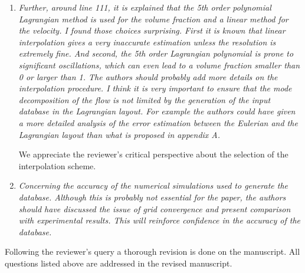 \documentclass[a4paper]{article}
\begin{document}
\begin{enumerate}
\item
\textit{Further, around line 111, it is explained that the 5th order polynomial Lagrangian method is used for the volume fraction and a linear method for the velocity. I found those choices surprising. First it is known that linear interpolation gives a very inaccurate estimation unless the resolution is extremely fine. And second, the 5th order Lagrangian polynomial is prone to significant oscillations, which can even lead to a volume fraction smaller than 0 or larger than 1. The authors should probably add more details on the interpolation procedure. I think it is very important to ensure that the mode decomposition of the flow is not limited by the generation of the input database in the Lagrangian layout. For example the authors could have given a more detailed analysis of the error estimation between the Eulerian and the Lagrangian layout than what is proposed in appendix A.}
\vspace{.2cm}


We appreciate the reviewer's critical perspective about the selection of the interpolation scheme. 


\item
\textit{Concerning the accuracy of the numerical simulations used to generate the database. Although this is probably not essential for the paper, the authors should have discussed the issue of grid convergence and present comparison with experimental results. This will reinforce confidence in the accuracy of the database.}
\vspace{.2cm}


\end{enumerate}

Following the reviewer's query a thorough revision is done on the manuscript. All questions listed above are addressed in the revised manuscript.

\end{document}
